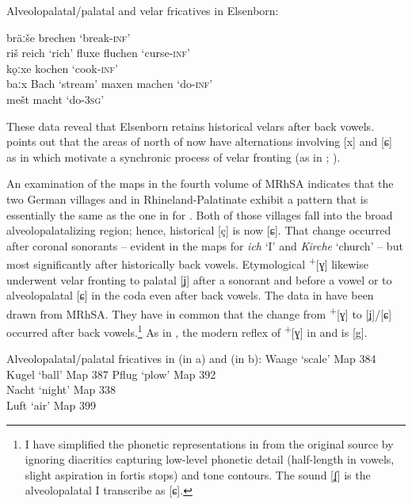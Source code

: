 \ea%
\label{ex:14:42}Alveolopalatal/palatal and velar fricatives in Elsenborn:

\ea\label{ex:14:42a} bräːše \tab [bræːɕə] \tab brechen \tab ‘break\textsc{{}-inf}’ \\
    riš \tab [riɕ] \tab reich \tab ‘rich’ 
\ex\label{ex:14:42b} fluxe \tab [fluxə] \tab fluchen \tab ‘curse\textsc{{}-inf}’ \\
    kǫːxe \tab [kɔxə] \tab kochen \tab ‘cook\textsc{{}-inf}’ \\
    baːx \tab [bɑːx] \tab Bach \tab ‘stream’ 
\ex\label{ex:14:42c} maxen \tab [mɑxə] \tab machen \tab ‘do-\textsc{inf}’ \\
    mešt \tab [meɕt] \tab macht \tab ‘do-\textsc{3sg}’ 
\z 
\z 

These data reveal that Elsenborn retains historical velars after back vowels. \citet{Hecker1972} points out that the areas of  north of  now have alternations involving [x] and [ɕ] as in  which motivate a synchronic process of velar fronting (as in ; ).

An examination of the maps in the fourth volume of MRhSA indicates that the two German villages  and  in Rhineland-Palatinate exhibit a pattern that is essentially the same as the one in  for . Both of those villages fall into the broad alveolopalatalizing region; hence, historical [ç] is now [ɕ]. That change occurred after coronal sonorants -- evident in the maps for \textit{ich} ‘I’ and \textit{Kirche} ‘church’ -- but most significantly after historically back vowels. Etymological \textsuperscript{+}[ɣ] likewise underwent velar fronting to palatal [ʝ] after a sonorant and before a vowel or to alveolopalatal [ɕ] in the coda even after back vowels. The data in  have been drawn from MRhSA. They have in common that the change from \textsuperscript{+}[ɣ] to [ʝ]/[ɕ] occurred after back vowels.\footnote{{I have simplified the phonetic representations in  from the original source by ignoring diacritics capturing low-level phonetic detail (half-length in vowels, slight aspiration in fortis stops) and tone contours. The sound [ʆ] is the alveolopalatal  I transcribe as [ɕ].}} As in , the modern reflex of  \textsuperscript{+}[ɣ] in  and  is [g].

\ea%
\label{ex:14:43}Alveolopalatal/palatal fricatives in  (in a) and  (in b):
\ea\label{ex:14:43a}\relax [βɔʆ] \tab Waage \tab ‘scale’ \tab Map 384\\
    \relax [kʊʝəl] \tab Kugel \tab ‘ball’ \tab Map 387
\ex\label{ex:14:43b}\relax [b̥lʊʆ] \tab Pflug \tab ‘plow’ \tab Map 392\\
    \relax [nɑːʆd̥] \tab Nacht \tab ‘night’ \tab Map 338\\
    \relax [lʊːʆd̥] \tab Luft \tab ‘air’ \tab Map 399
\z 
\z 

